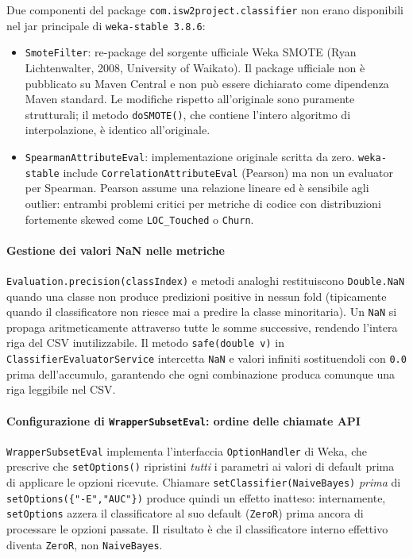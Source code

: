 Due componenti del package \texttt{com.isw2project.classifier} non erano disponibili nel
jar principale di \texttt{weka-stable 3.8.6}:

\begin{itemize}
\item \texttt{SmoteFilter}: re-package del sorgente ufficiale Weka SMOTE (Ryan
Lichtenwalter, 2008, University of Waikato). Il package ufficiale non è pubblicato su
Maven Central e non può essere dichiarato come dipendenza Maven standard. Le modifiche
rispetto all'originale sono puramente strutturali; il metodo \texttt{doSMOTE()}, che
contiene l'intero algoritmo di interpolazione, è identico all'originale.

\item \texttt{SpearmanAttributeEval}: implementazione originale scritta da zero.
\texttt{weka-stable} include \texttt{CorrelationAttributeEval} (Pearson) ma non un
evaluator per Spearman. Pearson assume una relazione lineare ed è sensibile agli outlier:
entrambi problemi critici per metriche di codice con distribuzioni fortemente skewed come
\texttt{LOC\_Touched} o \texttt{Churn}.
\end{itemize}

\paragraph{Gestione dei valori NaN nelle metriche}

\texttt{Evaluation.precision(classIndex)} e metodi analoghi restituiscono
\texttt{Double.NaN} quando una classe non produce predizioni positive in nessun fold
(tipicamente quando il classificatore non riesce mai a predire la classe minoritaria).
Un \texttt{NaN} si propaga aritmeticamente attraverso tutte le somme successive,
rendendo l'intera riga del CSV inutilizzabile. Il metodo \texttt{safe(double v)} in
\texttt{ClassifierEvaluatorService} intercetta \texttt{NaN} e valori infiniti
sostituendoli con \texttt{0.0} prima dell'accumulo, garantendo che ogni combinazione
produca comunque una riga leggibile nel CSV.

\paragraph{Configurazione di \texttt{WrapperSubsetEval}: ordine delle chiamate API}

\texttt{WrapperSubsetEval} implementa l'interfaccia \texttt{OptionHandler} di Weka,
che prescrive che \texttt{setOptions()} ripristini \emph{tutti} i parametri ai valori
di default prima di applicare le opzioni ricevute. Chiamare
\texttt{setClassifier(NaiveBayes)} \emph{prima} di \texttt{setOptions(\{"-E","AUC"\})}
produce quindi un effetto inatteso: internamente, \texttt{setOptions} azzera il
classificatore al suo default (\texttt{ZeroR}) prima ancora di processare le opzioni
passate. Il risultato è che il classificatore interno effettivo diventa \texttt{ZeroR},
non \texttt{NaiveBayes}.


